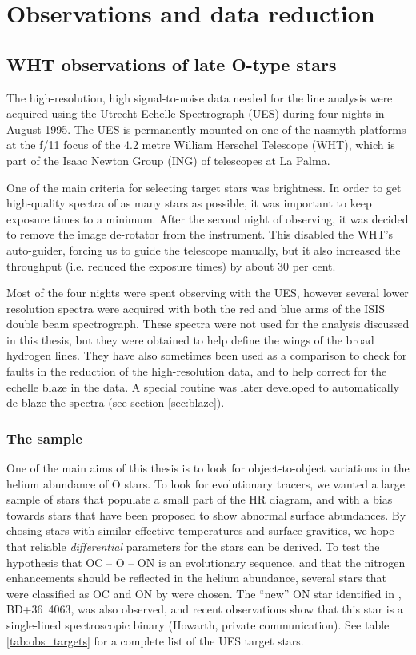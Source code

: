 \chapter{Observations and data reduction}
\label{ch:obs}

\section{WHT observations of late O-type stars}

The high-resolution, high signal-to-noise data needed for the line
analysis were acquired using the Utrecht Echelle Spectrograph (UES)
during four nights in August 1995. The UES is permanently mounted on
one of the nasmyth platforms at the f/11 focus of the 4.2 metre
William Herschel Telescope (WHT), which is part of the Isaac Newton
Group (ING) of telescopes at La Palma.

One of the main criteria for selecting target stars was brightness. In
order to get high-quality spectra of as many stars as possible, it was
important to keep exposure times to a minimum. After the second night
of observing, it was decided to remove the image de-rotator from the
instrument. This disabled the WHT's auto-guider, forcing us to guide
the telescope manually, but it also increased the throughput (i.e. reduced
the exposure times) by about 30 per cent.

Most of the four nights were spent observing with the UES, however
several lower resolution spectra were acquired with both the red and blue
arms of the ISIS double beam spectrograph. These spectra were not used
for the analysis discussed in this thesis, but they were obtained to
help define the wings of the broad hydrogen lines. They have also
sometimes been used as a comparison to check for faults in the reduction of
the high-resolution data, and to help correct for the echelle blaze in
the data. A special routine was later developed to automatically
de-blaze the spectra (see section \ref{sec:blaze}).

\subsection{The sample}

One of the main aims of this thesis is to look for object-to-object
variations in the helium abundance of O stars. To look for
evolutionary tracers, we wanted a large sample of stars that populate
a small part of the HR diagram, and with a bias towards stars that
have been proposed to show abnormal surface abundances. By chosing
stars with similar effective temperatures and surface gravities, we
hope that reliable \emph{differential} parameters for the stars can be
derived.  To test the hypothesis that OC -- O -- ON is an evolutionary
sequence, and that the nitrogen enhancements should be reflected in
the helium abundance, several stars that were classified as OC and ON
by  were chosen. The ``new'' ON star identified in
, BD+36~4063, was also observed, and recent observations
show that this star is a single-lined spectroscopic binary (Howarth,
private communication).  See table
\ref{tab:obs_targets} for a complete list of the UES target stars.

